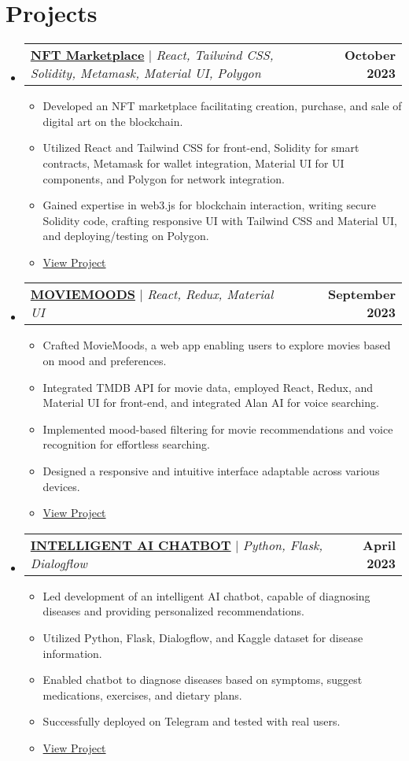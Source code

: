 \documentclass[letterpaper,11pt]{article}
\makeatletter
\newcommand{\resumeItem}[1]{
  \item\small{
    {#1 \vspace{-2pt}}
  }
}
\newcommand{\resumeProjectHeading}[2]{
    \item
    \begin{tabular*}{1.001\textwidth}{l@{\extracolsep{\fill}}r}
      \small#1 & \textbf{\small #2}\\
    \end{tabular*}\vspace{-7pt}
}
\newcommand{\resumeSubHeadingListStart}{\begin{itemize}[leftmargin=0.0in, label={}]}
\newcommand{\resumeSubHeadingListEnd}{\end{itemize}}
\newcommand{\resumeItemListStart}{\begin{itemize}}
\newcommand{\resumeItemListEnd}{\end{itemize}\vspace{-5pt}}
\makeatother
\begin{document}
\section{Projects}
    \vspace{-5pt}
    \resumeSubHeadingListStart
    \resumeProjectHeading
          {\href{https://nft---marketplace.vercel.app/}{\textbf{NFT Marketplace}} $|$ \emph{React, Tailwind CSS, Solidity, Metamask, Material UI, Polygon}}{October 2023}
          \resumeItemListStart
            \resumeItem{Developed an NFT marketplace facilitating creation, purchase, and sale of digital art on the blockchain.}
            \resumeItem{Utilized React and Tailwind CSS for front-end, Solidity for smart contracts, Metamask for wallet integration, Material UI for UI components, and Polygon for network integration.}
            \resumeItem{Gained expertise in web3.js for blockchain interaction, writing secure Solidity code, crafting responsive UI with Tailwind CSS and Material UI, and deploying/testing on Polygon.}
            \resumeItem{\href{https://nft---marketplace.vercel.app/}{View Project}} %
          \resumeItemListEnd  
          \vspace{-13pt}
          \resumeProjectHeading
          {\href{https://moviemoods.vercel.app/}{\textbf{MOVIEMOODS}} $|$ \emph{React, Redux, Material UI}}{September 2023}
          \resumeItemListStart
            \resumeItem{Crafted MovieMoods, a web app enabling users to explore movies based on mood and preferences.}
            \resumeItem{Integrated TMDB API for movie data, employed React, Redux, and Material UI for front-end, and integrated Alan AI for voice searching.}
            \resumeItem{Implemented mood-based filtering for movie recommendations and voice recognition for effortless searching.}
            \resumeItem{Designed a responsive and intuitive interface adaptable across various devices.}
            \resumeItem{\href{https://moviemoods.vercel.app/}{View Project}} %
          \resumeItemListEnd 
          \vspace{-13pt}
          \resumeProjectHeading
          {\href{https://t.me/AI_DoctorBot}{\textbf{INTELLIGENT AI CHATBOT}} $|$ \emph{Python, Flask, Dialogflow}}{April 2023}
          \resumeItemListStart
            \resumeItem{Led development of an intelligent AI chatbot, capable of diagnosing diseases and providing personalized recommendations.}
            \resumeItem{Utilized Python, Flask, Dialogflow, and Kaggle dataset for disease information.}
            \resumeItem{Enabled chatbot to diagnose diseases based on symptoms, suggest medications, exercises, and dietary plans.}
            \resumeItem{Successfully deployed on Telegram and tested with real users.}
            \resumeItem{\href{https://t.me/AI_DoctorBot}{View Project}} %
          \resumeItemListEnd 
    \resumeSubHeadingListEnd
\vspace{-15pt}
\end{document}
